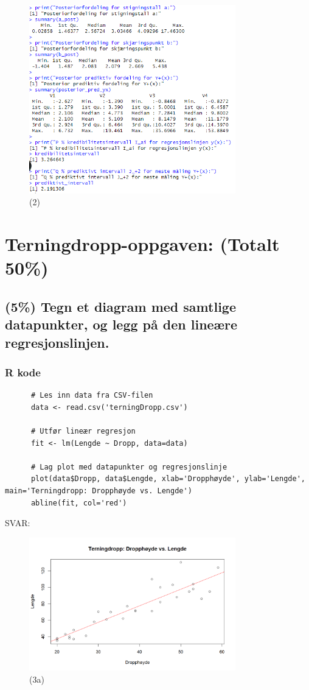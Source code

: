 \documentclass[12pt]{article}
\begin{document}
\begin{figure}[H]
  \centering
  \includegraphics[width=0.8\textwidth]{2.png}
  \caption{(2)}
\end{figure}


\section{Terningdropp-oppgaven: (Totalt 50\%)}
\subsection{(5\%) Tegn et diagram med samtlige datapunkter, og legg på den lineære regresjonslinjen.}
\subsubsection{R kode}
\begin{verbatim}
      # Les inn data fra CSV-filen
      data <- read.csv('terningDropp.csv')
      
      # Utfør lineær regresjon
      fit <- lm(Lengde ~ Dropp, data=data)
      
      # Lag plot med datapunkter og regresjonslinje
      plot(data$Dropp, data$Lengde, xlab='Dropphøyde', ylab='Lengde', main='Terningdropp: Dropphøyde vs. Lengde')
      abline(fit, col='red')  
    \end{verbatim}
SVAR:
\begin{figure}[H]
  \centering
  \includegraphics[width=0.8\textwidth]{3a.png}
  \caption{(3a)}
\end{figure}
\end{document}
